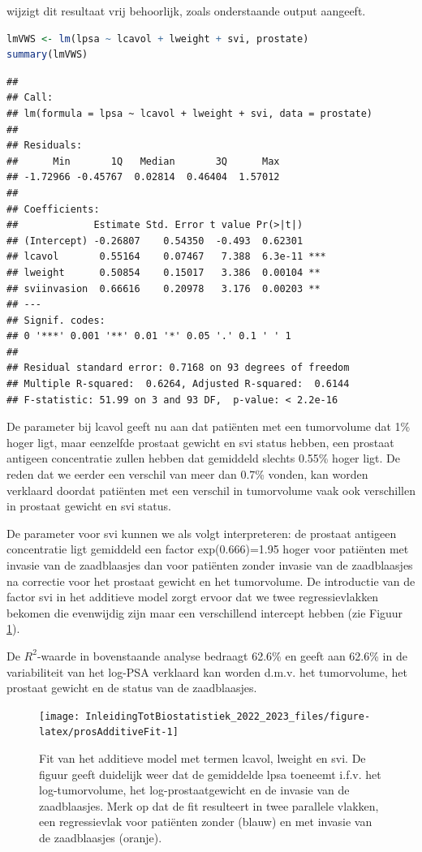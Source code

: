 \documentclass[
  12pt,dutch,coursenotes]{book}
\begin{document}
wijzigt dit resultaat vrij behoorlijk, zoals onderstaande output aangeeft.

\begin{lstlisting}[language=R]
lmVWS <- lm(lpsa ~ lcavol + lweight + svi, prostate)
summary(lmVWS)
\end{lstlisting}

\begin{lstlisting}
## 
## Call:
## lm(formula = lpsa ~ lcavol + lweight + svi, data = prostate)
## 
## Residuals:
##      Min       1Q   Median       3Q      Max 
## -1.72966 -0.45767  0.02814  0.46404  1.57012 
## 
## Coefficients:
##             Estimate Std. Error t value Pr(>|t|)    
## (Intercept) -0.26807    0.54350  -0.493  0.62301    
## lcavol       0.55164    0.07467   7.388  6.3e-11 ***
## lweight      0.50854    0.15017   3.386  0.00104 ** 
## sviinvasion  0.66616    0.20978   3.176  0.00203 ** 
## ---
## Signif. codes:  
## 0 '***' 0.001 '**' 0.01 '*' 0.05 '.' 0.1 ' ' 1
## 
## Residual standard error: 0.7168 on 93 degrees of freedom
## Multiple R-squared:  0.6264, Adjusted R-squared:  0.6144 
## F-statistic: 51.99 on 3 and 93 DF,  p-value: < 2.2e-16
\end{lstlisting}

De parameter bij lcavol geeft nu aan dat patiënten met een tumorvolume dat 1\% hoger ligt, maar eenzelfde prostaat gewicht en svi status hebben, een prostaat antigeen concentratie zullen hebben dat gemiddeld slechts 0.55\% hoger ligt.
De reden dat we eerder een verschil van meer dan 0.7\% vonden, kan worden verklaard doordat patiënten met een verschil in tumorvolume vaak ook verschillen in prostaat gewicht en svi status.

De parameter voor svi kunnen we als volgt interpreteren: de prostaat antigeen concentratie ligt gemiddeld een factor exp(0.666)=1.95 hoger voor patiënten met invasie van de zaadblaasjes dan voor patiënten zonder invasie van de zaadblaasjes na correctie voor het prostaat gewicht en het tumorvolume. De introductie van de factor svi in het additieve model zorgt ervoor dat we twee regressievlakken bekomen die evenwijdig zijn maar een verschillend intercept hebben (zie Figuur \ref{fig:prosAdditiveFit}).

De \(R^2\)-waarde in bovenstaande analyse bedraagt 62.6\% en geeft aan 62.6\% in de variabiliteit van het log-PSA verklaard kan worden d.m.v. het tumorvolume, het prostaat gewicht en de status van de zaadblaasjes.

\begin{figure}

{\centering \texttt{[image: InleidingTotBiostatistiek\_2022\_2023\_files/figure-latex/prosAdditiveFit-1]} 

}

\caption{Fit van het additieve model met termen lcavol, lweight en svi. De figuur geeft duidelijk weer dat de gemiddelde lpsa toeneemt i.f.v. het log-tumorvolume, het log-prostaatgewicht en de invasie van de zaadblaasjes. Merk op dat de fit resulteert in twee parallele vlakken, een regressievlak voor patiënten zonder (blauw) en met invasie van de zaadblaasjes (oranje).}\label{fig:prosAdditiveFit}
\end{figure}
\end{document}

